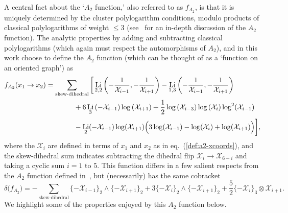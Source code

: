 \documentclass[11pt]{article}
\DeclareMathOperator{\Li}{Li}
\def\x{\mathcal{X}}
\begin{document}
A central fact about the `$A_2$ function,' also referred to as $f_{A_2}$, is that it is uniquely determined by the cluster polylogarithm conditions, modulo products of classical polylogarithms of weight $\le3$ (see~\cite{Golden:2014xqa} for an in-depth discussion of the $A_2$ function). The analytic properties by adding and subtracting classical polylogarithms (which again must respect the automorphisms of $A_2$), and in this work choose to define the $A_2$ function (which can be thought of as a `function on an oriented graph') as
\begin{align}\label{def:a2-function}
	f_{A_2}(x_1 \to x_2)  &= \sum_{\text{skew-dihedral}} \bigg[ \Li_{2,2}\left(-\frac{1}{\x_{i-1}},-\frac{1}{\x_{i+1}}\right) - \Li_{1,3}\left(-\frac{1}{\x_{i-1}},-\frac{1}{\x_{i+1}}\right) \nonumber \\
	&\hspace{1.4cm} +6 \Li_3\left(-\x_{i-1}\right) \log \left(\x_{i+1}\right) +\frac{1}{2} \log \left(\x_{i-3}\right) \log \left(\x_i\right) \log^2\! \left(\x_{i-1}\right) {\color{white} \bigg|}\\
	&\hspace{1.4cm} -\Li_2(-\x_{i-1}) \log (\x_{i+1}) \Big(3 \log (\x_{i-1})-\log (\x_i)+\log (\x_{i+1})\Big) \bigg], \nonumber
\end{align}
where the $\x_i$ are defined in terms of $x_1$ and $x_2$ as in eq.~(\ref{def:a2-xcoords}), and the skew-dihedral sum indicates subtracting the dihedral flip $\x_i \to \x_{6-i}$ and taking a cyclic sum $i=1$ to $5$. This function differs in a few salient respects from the $A_2$ function defined in~\cite{Golden:2014xqa}, but (necessarily) has the same cobracket
\begin{equation} \label{eq:A2_cobracket}
	\delta\big(f_{A_2}\big) = -\sum_{\text{skew-dihedral}} \{-\x_{i-1}\}_2 \wedge \{-\x_{i+1}\}_2 + 3\{-\x_{i}\}_2 \wedge \{-\x_{i+1}\}_2 + \frac{5}{2}\{-\x_{i}\}_3 \otimes \x_{i+1}.
\end{equation}
We highlight some of the properties enjoyed by this $A_2$ function below.
\end{document}
